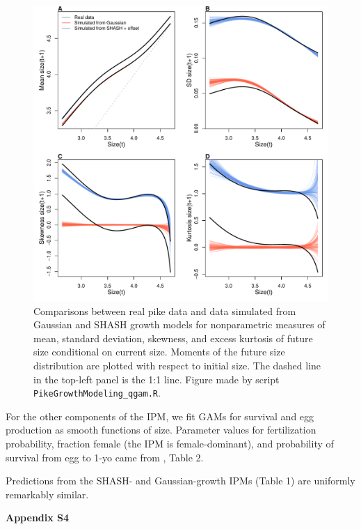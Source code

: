 \documentclass[12pt]{article}
\begin{document}
\begin{spacing}{1.35}
	\begin{figure}[tbp]
		\centering
		\includegraphics[width=1.0\textwidth]{figures/pike_SHASH_fit.pdf}
		\caption{Comparisons between real pike data and data simulated from Gaussian and SHASH growth models for nonparametric measures of mean, standard deviation, 
			skewness, and excess kurtosis of future size conditional on current size. 
			Moments of the future size distribution are plotted with respect to initial size. The dashed line in the top-left panel is the 1:1 line. 
			Figure made by script \texttt{PikeGrowthModeling\_qgam.R}.}
		\label{fig:pikeSims}
	\end{figure} 
	
	For the other components of the IPM, we fit GAMs for survival and egg production as smooth functions of size. 
	Parameter values for fertilization probability, fraction female (the IPM is female-dominant), and probability of survival from egg to 1-yo 
	came from \cite{stubberud2019effects}, Table 2. 
	
	Predictions from the SHASH- and Gaussian-growth IPMs (Table 1) are uniformly remarkably similar. 
	
	\clearpage 
	
		\newpage
	\linenumbers
	\centerline{\Large{\textbf{Appendix S4}}}
	\renewcommand{\thetable}{S-\arabic{table}}
	\renewcommand{\thefigure}{S-\arabic{figure}}
	\renewcommand{\thesection}{S.\arabic{section}}
	\renewcommand{\theequation}{S\arabic{equation}}
	\setcounter{page}{1}
	\setcounter{equation}{0}
	\setcounter{figure}{0}
	\setcounter{section}{0}
	\setcounter{table}{0}

\end{spacing}
\end{document}
